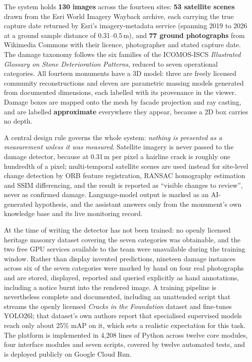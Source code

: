 \documentclass[a4paper,12pt,oneside]{book}
\begin{document}
The system holds \textbf{130 images} across the fourteen sites: \textbf{53 satellite scenes} drawn from the Esri World Imagery Wayback archive, each carrying the true capture date returned by Esri's imagery-metadata service (spanning 2019 to 2026 at a ground sample distance of 0.31--0.5\,m), and \textbf{77 ground photographs} from Wikimedia Commons with their licence, photographer and stated capture date. The damage taxonomy follows the six families of the ICOMOS-ISCS \textit{Illustrated Glossary on Stone Deterioration Patterns}, reduced to seven operational categories. All fourteen monuments have a 3D model: three are freely licensed community reconstructions and eleven are parametric massing models generated from documented dimensions, each labelled with its provenance in the viewer. Damage boxes are mapped onto the mesh by facade projection and ray casting, and are labelled \textbf{approximate} everywhere they appear, because a 2D box carries no depth.

A central design rule governs the whole system: \textit{nothing is presented as a measurement unless it was measured}. Satellite imagery is never passed to the damage detector, because at 0.31\,m per pixel a hairline crack is roughly one hundredth of a pixel; multi-temporal satellite scenes are used instead for site-level change detection by ORB feature registration, RANSAC homography estimation and SSIM differencing, and the result is reported as ``visible changes to review'', never as confirmed damage. Language-model output is marked as an AI-generated hypothesis, and the assistant answers only from the monument's own knowledge base and its live monitoring record.

At the time of writing the detector has not been trained: no openly licensed heritage masonry dataset covering the seven categories was obtainable, and the two free GPU services available to the team were unavailable during the training window. Rather than display invented predictions, nineteen damage instances across six of the seven categories were marked by hand on four real photographs and are stored, displayed, reported and queried explicitly as hand annotations, including a notice burnt into the rendered image. A training pipeline is nevertheless complete and documented, including an unattended script that streams the openly licensed \textit{Cracks in the Foundation} dataset and fine-tunes YOLO26l; that dataset's own authors report that specialised supervised models reach only about 25\% mAP on it, which sets a realistic expectation for this task. The platform is implemented in 4{,}208 lines of Python across twelve core modules, four interface modules and seven scripts, covered by twelve automated tests, and is deployed publicly on Google Cloud Run.
\end{document}
